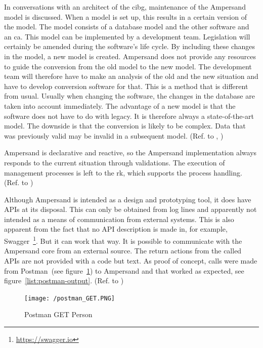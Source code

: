 In conversations with an architect of the \acrshort{cibg}, maintenance of the Ampersand model is discussed.
When a model is set up, this results in a certain version of the model.
The model consists of a database model and the other software and an \acrshort{ca}.
This model can be implemented by a development team.
Legislation will certainly be amended during the software's life cycle.
By including these changes in the model, a new model is created.
Ampersand does not provide any resources to guide the conversion from the old model to the new model.
The development team will therefore have to make an analysis of the old and the new situation and have to develop conversion software for that.
This is a method that is different from usual.
Usually when changing the software, the changes in the database are taken into account immediately.
The advantage of a new model is that the software does not have to do with legacy.
It is therefore always a state-of-the-art model.
The downside is that the conversion is likely to be complex.
Data that was previously valid may be invalid in a subsequent model.
(Ref. to , )


Ampersand is declarative and reactive, so the Ampersand implementation always responds to the current situation through validations.
The execution of management processes is left to the \acrshort{rk}, which supports the process handling.
(Ref. to )


Although Ampersand is intended as a design and prototyping tool, it does have APIs at its disposal.
This can only be obtained from log lines and apparently not intended as a means of communication from external systems.
This is also apparent from the fact that no API description is made in, for example, Swagger~\footnote{\url{https://swagger.io}}.
But it can work that way.
It is possible to communicate with the Ampersand core from an external source.
The return actions from the called APIs are not provided with a code but text.
As proof of concept, calls were made from Postman~(see figure~\ref{fig:postman-get-person}) to Ampersand and that worked as expected, see figure~\ref{list:postman-output}.
(Ref. to )
\begin{figure}[ht]
    \centering
    \texttt{[image: /postman\_GET.PNG]}
    \caption{Postman GET Person}
    \label{fig:postman-get-person}
\end{figure}

